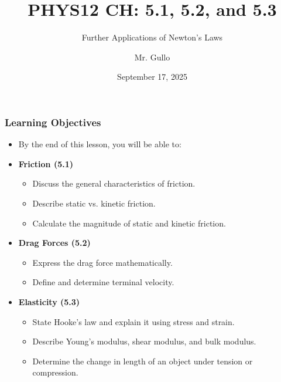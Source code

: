 \documentclass{beamer}
\title[Friction, Drag, and Elasticity]{PHYS12 CH: 5.1, 5.2, and 5.3}
\subtitle{Further Applications of Newton's Laws}
\author[Mr. Gullo]{Mr. Gullo}
\date[Fall 2025]{September 17, 2025}
\begin{document}
\frame{\titlepage}

\begin{frame}
\frametitle{Learning Objectives}
\begin{itemize}
    \item By the end of this lesson, you will be able to: \pause
    \item \textbf{Friction (5.1)}
    \begin{itemize}
        \item Discuss the general characteristics of friction. \pause
        \item Describe static vs. kinetic friction. \pause
        \item Calculate the magnitude of static and kinetic friction.
    \end{itemize} \pause
    \item \textbf{Drag Forces (5.2)}
    \begin{itemize}
        \item Express the drag force mathematically. \pause
        \item Define and determine terminal velocity.
    \end{itemize} \pause
    \item \textbf{Elasticity (5.3)}
    \begin{itemize}
        \item State Hooke's law and explain it using stress and strain. \pause
        \item Describe Young's modulus, shear modulus, and bulk modulus. \pause
        \item Determine the change in length of an object under tension or compression.
    \end{itemize}
\end{itemize}
\end{frame}
\end{document}
